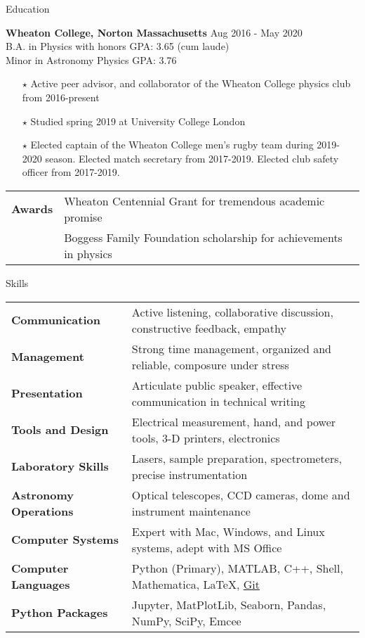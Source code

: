 \documentclass{resume} %
\begin{document}
\begin{rSection}{Education}

{\bf Wheaton College, Norton Massachusetts} \hfill {Aug 2016 - May 2020} \\
 B.A. in Physics with honors \hfill {GPA: 3.65 (cum laude)}
\\ Minor in Astronomy \hfill {Physics GPA: 3.76}
\begin{itemize}\itemsep -6pt
 \item[$\star$] Active peer advisor, and collaborator of the Wheaton College physics club from 2016-present
 \item[$\star$] Studied spring 2019 at University College London
 \item[$\star$] Elected captain of the Wheaton College men's rugby team during 2019-2020 season. Elected match secretary from 2017-2019. Elected club safety officer from 2017-2019.
\end{itemize}
\begin{tabular}{ @{} >{\hspace{5mm}\bfseries}l @{\hspace{2ex}} l }
Awards & Wheaton Centennial Grant for tremendous academic promise\\
& Boggess Family Foundation scholarship for achievements in physics
\end{tabular}
\end{rSection}

\begin{rSection}{Skills}
\begin{tabular}{ @{} >{\bfseries}l @{\hspace{2ex}} l }
Communication & Active listening, collaborative discussion, constructive feedback, empathy\\
Management & Strong time management, organized and reliable, composure under stress\\
Presentation & Articulate public speaker, effective communication in technical writing \\
Tools and Design & Electrical measurement, hand, and power tools, 3-D printers, electronics\\
Laboratory Skills & Lasers, sample preparation, spectrometers, precise instrumentation\\
Astronomy Operations & Optical telescopes, CCD cameras, dome and instrument maintenance\\
Computer Systems & Expert with Mac, Windows, and Linux systems, adept with MS Office\\
Computer Languages &  Python (Primary), MATLAB, C++, Shell, Mathematica, \LaTeX, \href{https://github.com/seanmacb}{Git}\\
Python Packages & Jupyter, MatPlotLib, Seaborn, Pandas, NumPy, SciPy, Emcee\\


\end{tabular}
\end{rSection}
\end{document}
